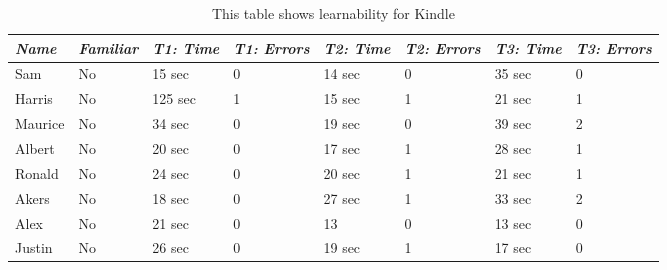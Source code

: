 \documentclass[12pt,letterpaper]{article}
\begin{document}
    \begin{table}
        \centering
        \begin{tabular}{|l|l|l|l|l|l|l|l|}
            \hline
            \emph{Name} & \emph{Familiar} & \emph{T1: Time} & \emph{T1: Errors} & \emph{T2: Time} & \emph{T2: Errors} & \emph{T3: Time} & \emph{T3: Errors} \\
            \hline
            Sam & No & 15 sec & 0 & 14 sec & 0 & 35 sec & 0 \\
            \hline
            Harris & No & 125 sec & 1 & 15 sec & 1 & 21 sec & 1 \\
            \hline
            Maurice & No & 34 sec & 0 & 19 sec & 0 & 39 sec & 2 \\
            \hline
            Albert & No & 20 sec & 0 & 17 sec & 1 & 28 sec & 1 \\
            \hline
            Ronald & No & 24 sec & 0 & 20 sec & 1 & 21 sec & 1 \\
            \hline
            Akers & No & 18 sec & 0 & 27 sec & 1 & 33 sec & 2 \\
            \hline
            Alex & No & 21 sec & 0 & 13 & 0 & 13 sec & 0 \\
            \hline
            Justin & No & 26 sec & 0 & 19 sec & 1 & 17 sec & 0 \\
        \end{tabular}
        \caption{This table shows learnability for Kindle}
    \end{table}
\end{document}

